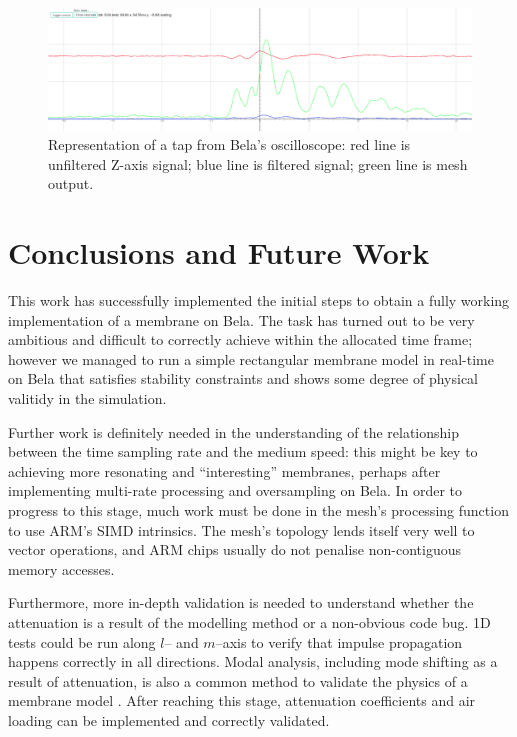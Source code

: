 \documentclass{article}
\begin{document}
\begin{figure}
    \centering
    \includegraphics[width=\textwidth]{fig/bela-hit}
    \caption{Representation of a tap from Bela's oscilloscope:
    red line is unfiltered Z-axis signal;
    blue line is filtered signal;
    green line is mesh output.}\label{fig:bela}
\end{figure}


\section{Conclusions and Future Work}

This work has successfully implemented the initial steps
to obtain a fully working implementation of a membrane on Bela.
The task has turned out to be very ambitious and difficult to
correctly achieve within the allocated time frame; however
we managed to run a simple rectangular membrane model in real-time
on Bela that satisfies stability constraints and shows some degree
of physical valitidy in the simulation.

Further work is definitely needed in the understanding of the
relationship between the time sampling rate and the medium speed:
this might be key to achieving more resonating and ``interesting''
membranes, perhaps after implementing multi-rate processing and
oversampling on Bela. In order to progress to this stage,
much work must be done in the mesh's processing function to
use ARM's SIMD intrinsics. The mesh's topology lends itself very
well to vector operations, and ARM chips usually do not
penalise non-contiguous memory accesses.

Furthermore, more in-depth validation is needed to understand
whether the attenuation is a result of the modelling method
or a non-obvious code bug. 1D tests could be run along \(l\)--
and \(m\)--axis to verify that impulse propagation happens
correctly in all directions. Modal analysis, including mode shifting
as a result of attenuation, is also a common method to validate
the physics of a membrane model \cite{fontana1998physical}.
After reaching this stage, attenuation coefficients and air
loading can be implemented and correctly validated.
\end{document}
